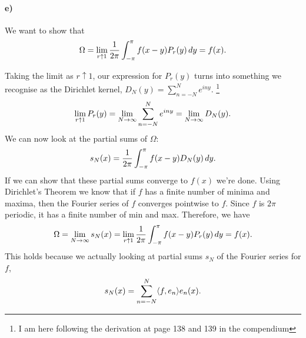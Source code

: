 \documentclass[a4paper]{article}
\begin{document}
\paragraph{e)}
  
We want to show that 
\begin{equation}
  \notag
  \Omega = \lim\limits_{r\uparrow 1} \frac{1}{2\pi}\int_{-\pi}^{\pi}f(x-y)P_r(y) \, dy = f(x).
\end{equation}

Taking the limit as $r \uparrow 1$, our expression for $P_r(y)$ turns into something we recognise
as the Dirichlet kernel, $D_N(y) = \sum_{n=-N}^{N}e^{iny}$.  \footnote{I am here following the derivation at page 138 and 139 in the compendium}
\begin{equation}
  \notag
  \lim\limits_{r\uparrow 1} P_r(y) = \lim\limits_{N\rightarrow\infty}\sum_{n = -N}^{N}e^{iny} = \lim_{N\rightarrow \infty}D_N(y).
\end{equation}
We can now look at the partial sums of $\Omega$:
\begin{equation}
  \notag
  s_N(x) = \frac{1}{2\pi}\int_{-\pi}^{\pi}f(x - y)D_N(y)\, dy.
\end{equation}
If we can show that these partial sums converge to $f(x)$ we're done.  Using
Dirichlet's Theorem we know that if $f$ has a finite number of minima and
maxima, then the Fourier series of $f$ converges pointwise to $f$. Since $f$ is
$2\pi$ periodic, it has a finite number of min and max. Therefore, we have
\begin{equation}
  \notag
  \Omega = \lim\limits_{N \rightarrow \infty} s_N(x) = \lim\limits_{r\uparrow 1}\frac{1}{2\pi}\int_{-\pi}^{\pi}f(x - y)P_r(y) \, dy = f(x).
\end{equation}
This holds because we actually looking at partial sums $s_N$ of the Fourier series for $f$, 
\begin{equation}
  \notag
  s_N(x) = \sum_{n=-N}^{N}\langle f, e_n \rangle e_n(x).
\end{equation}
\end{document}
